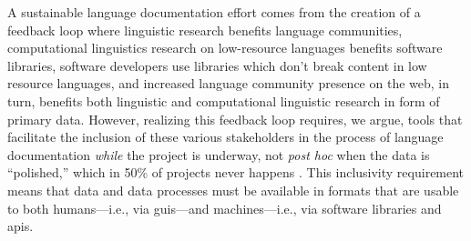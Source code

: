 \documentclass[11pt]{article}
\newcommand{\smalltodo}[2][]
    {\todo[caption={#2}, #1]
    {\tiny#2\normalsize}}
\begin{document}
A sustainable language documentation effort comes from the creation of a
feedback loop where linguistic research benefits language communities,
computational linguistics research on low-resource languages benefits software
libraries, software developers use libraries which don't break content in
low resource languages,%
and increased language community presence on the web, in turn, benefits both
linguistic and computational linguistic research in form of primary data.%
However, realizing this feedback loop requires, we argue, tools that facilitate
the inclusion of these various stakeholders in the process of language documentation
\emph{while} the project is underway, not \emph{post hoc} when the data is ``polished,''
which in 50\% of projects never happens \cite{Thieberger:2012}. This
inclusivity requirement means that data and data processes must be available in
formats that are usable to both humans---i.e., via \glspl{gui}---and machines---i.e.,
via software libraries and \glspl{api}.
\end{document}
